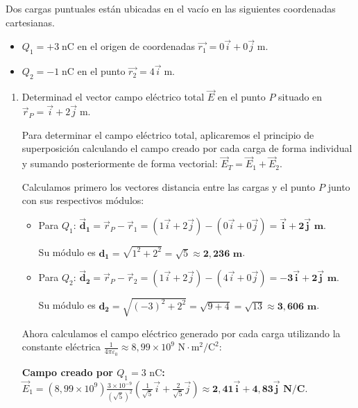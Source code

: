 \documentclass[11pt, a4paper]{article}
\newenvironment{problem}[1][Cuestión]{
	\vspace{0.5cm}
	\noindent{\Large\bfseries #1} \par\vspace{0.5cm}
}{
	\vspace{0.5cm}
}
\begin{document}
	\begin{problem}[Cuestión 6]
		Dos cargas puntuales están ubicadas en el vacío en las siguientes coordenadas cartesianas.

		\begin{itemize}
			\item $Q_1 = +3 \; \text{nC}$ en el origen de coordenadas $\vec{r_1} = 0 \vec{i} + 0 \vec{j} \; \text{m}$.
			\item $Q_2 = -1 \; \text{nC}$ en el punto $\vec{r_2} = 4 \vec{i} \; \text{m}$.
		\end{itemize}

		\begin{enumerate}[label=\alph*)]
			\item Determinad el vector campo eléctrico total $\vec{E}$ en el punto $P$ situado en $\vec{r}_P = \vec{i} + 2 \vec{j} \; \text{m}$.

				{ \color{blue}
					Para determinar el campo eléctrico total, aplicaremos el principio de superposición calculando el campo creado por cada carga de forma individual y sumando posteriormente de forma vectorial: $\vec{E}_T = \vec{E}_1 + \vec{E}_2$.

					Calculamos primero los vectores distancia entre las cargas y el punto $P$ junto con sus respectivos módulos:
					\begin{itemize}
						\item Para $Q_1$: $\mathbf{\vec{d}_1} = \vec{r}_P - \vec{r}_1 = (1\vec{i} + 2\vec{j}) - (0\vec{i} + 0\vec{j}) = \mathbf{\vec{i} + 2\vec{j} \textbf{ m}}$. 

						Su módulo es $\mathbf{d_1} = \sqrt{1^2 + 2^2} = \sqrt{5} \approx \mathbf{2,236 \textbf{ m}}$.

						\item Para $Q_2$: $\mathbf{\vec{d}_2} = \vec{r}_P - \vec{r}_2 = (1\vec{i} + 2\vec{j}) - (4\vec{i} + 0\vec{j}) = \mathbf{-3\vec{i} + 2\vec{j} \textbf{ m}}$. 

						Su módulo es $\mathbf{d_2} = \sqrt{(-3)^2 + 2^2} = \sqrt{9 + 4} = \sqrt{13} \approx \mathbf{3,606 \textbf{ m}}$.
					\end{itemize}

					Ahora calculamos el campo eléctrico generado por cada carga utilizando la constante eléctrica $\frac{1}{4\pi\varepsilon_0} \approx 8,99 \times 10^9 \text{ N}\cdot\text{m}^2/\text{C}^2$:

					\textbf{Campo creado por $Q_1 = 3 \text{ nC}$:}
					$\vec{E}_1 = (8,99 \times 10^9) \frac{3 \times 10^{-9}}{(\sqrt{5})^2} \left( \frac{1}{\sqrt{5}}\vec{i} + \frac{2}{\sqrt{5}}\vec{j} \right) \approx \mathbf{2,41 \vec{i} + 4,83 \vec{j} \textbf{ N/C}}$.

}
\end{enumerate}
\end{problem}
\end{document}
